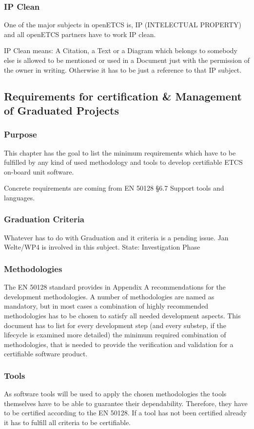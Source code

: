 \documentclass{template/openetcs_article}
\begin{document}
\subsubsection{IP Clean}
One of the major subjects in openETCS is, IP (INTELECTUAL PROPERTY) and all openETCS partners have to work IP clean.

IP Clean means: A Citation, a Text or a Diagram which belongs to somebody else is allowed to be mentioned or used in a Document just with the permission of the owner in writing. Otherwise it has to be just a reference to that IP subject.

\subsection{Requirements for certification \& Management of Graduated Projects}

\subsubsection{Purpose}
This chapter has the goal to list the minimum requirements which have to be fulfilled by any kind of used methodology and tools to develop certifiable ETCS on-board unit software. 

Concrete requirements are coming from EN 50128 {\S}6.7 Support tools and languages.


\subsubsection{Graduation Criteria}
Whatever has to do with Graduation and it criteria is a pending issue. Jan Welte/WP4 is involved in this subject. State: Investigation Phase


\subsubsection{Methodologies}
The EN 50128 standard provides in Appendix A recommendations for the development methodologies. A number of methodologies are named as mandatory, but in most cases a combination of highly recommended methodologies has to be chosen to satisfy all needed development aspects. This document has to list for every development step (and every substep, if the lifecycle is examined more detailed) the minimum required combination of methodologies, that is needed to provide the verification and validation for a certifiable software product.


\subsubsection{Tools}
As software tools will be used to apply the chosen methodologies the tools themselves have to be able to guarantee their dependability. Therefore, they have to be certified according to the EN 50128. If a tool has not been certified already it has to fulfill all criteria to be certifiable. 
\end{document}
